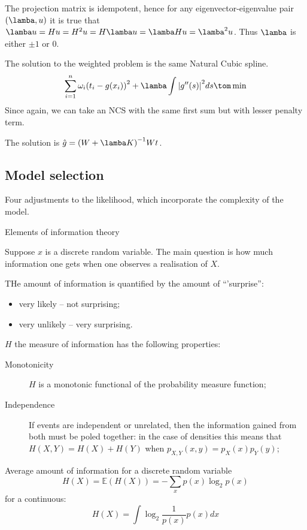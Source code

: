 \documentclass[a4paper]{article}
\newcommand{\brac}[1]{{\left ( #1 \right )}}
\newcommand{\abs}[1]{{\left | #1 \right |}}
\newcommand{\Ex}[0]{{\mathbb{E}}}
\begin{document}
The projection matrix is idempotent, hence for any eigenvector-eigenvalue pair $(\lamba, u)$ it is true that $\lamba u = Hu = H^2u = H\lamba u = \lamba Hu = \lamba^2 u$. Thus $\lamba$ is either $\pm1$ or $0$.

The solution to the weighted problem is the same Natural Cubic spline.
\[\sum_{i=1}^n \omega_i \brac{t_i - g(x_i)}^2 + \lamba \int \abs{g''(s)}^2 ds \tom \min\]
Since again, we can take an NCS with the same first sum but with lesser penalty term.

The solution is $\hat{g} = \brac{W+\lamba K}^{-1} Wt$.

\subsection{Model selection} %
\label{sub:model_selection}


Four adjustments to the likelihood, which incorporate the complexity of the model.

Elements of information theory

Suppose $x$ is a discrete random variable.
The main question is how much information one gets when one observes a realisation of $X$.

THe amount of information is quantified by the amount of ``'surprise'':\begin{itemize}
	\item very likely -- not surprising;
	\item very unlikely -- very surprising.
\end{itemize}

$H$ the measure of information has the following properties: \begin{description}
	\item[Monotonicity] $H$ is a monotonic functional of the probability measure function;
	\item[Independence] If events are independent or unrelated, then the information gained from both must be poled together: in the case of densities this means that $H(X,Y) = H(X)+H(Y)$ when $p_{X,Y}(x,y) = p_X(x) p_Y(y)$;
	\item[]
\end{description}

Average amount of information for a discrete random variable
\[H(X) = \Ex\brac{H(X)} = - \sum_x p(x) \log_2 p(x)\]
for a continuous:
\[H(X) = \int \log_2\frac{1}{p(x)} p(x) dx\]
\end{document}
